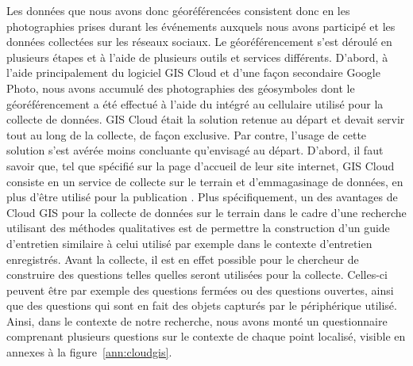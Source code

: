 Les données que nous avons donc géoréférencées consistent donc en les photographies prises durant les événements \lgbt{} auxquels nous avons participé et les données collectées sur les réseaux sociaux. 
Le géoréférencement s'est déroulé en plusieurs étapes et à l'aide de plusieurs outils et services différents. 
D'abord, à l'aide principalement du logiciel GIS Cloud et d'une façon secondaire Google Photo, nous avons accumulé des photographies des géosymboles dont le géoréférencement a été effectué à l'aide du \gps{} intégré au cellulaire utilisé pour la collecte de données. 
GIS Cloud était la solution retenue au départ et devait servir tout au long de la collecte, de façon exclusive. 
Par contre, l'usage de cette solution s'est avérée moins concluante qu'envisagé au départ. 
D'abord, il faut savoir que, tel que spécifié sur la page d'accueil de leur site internet, GIS Cloud consiste en un service de collecte sur le terrain et d’emmagasinage de données, en plus d'être utilisé pour la publication \citep{Cloud2014}. 
Plus spécifiquement, un des avantages de Cloud GIS pour la collecte de données sur le terrain dans le cadre d'une recherche utilisant des méthodes qualitatives est de permettre la construction d'un guide d'entretien similaire à celui utilisé par exemple dans le contexte d'entretien enregistrés. 
Avant la collecte, il est en effet possible pour le chercheur de construire des questions telles quelles seront utilisées pour la collecte.
Celles-ci peuvent être par exemple des questions fermées ou des questions ouvertes, ainsi que des questions qui sont en fait des objets capturés par le périphérique utilisé. 
Ainsi, dans le contexte de notre recherche, nous avons monté un questionnaire comprenant plusieurs questions sur le contexte de chaque point localisé, visible en annexes à la figure~\ref{ann:cloudgis}.

